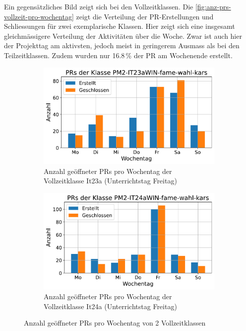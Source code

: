 Ein gegensätzliches Bild zeigt sich bei den Vollzeitklassen. Die \autoref{fig:anz-prs-vollzeit-pro-wochentag} zeigt die Verteilung der PR-Erstellungen und Schliessungen für zwei exemplarische Klassen.
Hier zeigt sich eine insgesamt gleichmässigere Verteilung der Aktivitäten über die Woche. Zwar ist auch hier der Projekttag am aktivsten, jedoch meist in geringerem Ausmass als bei den Teilzeitklassen. Zudem wurden nur 16.8\,\% der PR am Wochenende erstellt.

\begin{figure}[htbp]
    \centering
    \begin{subfigure}[b]{0.48\textwidth}
        \centering
        \includegraphics[width=\textwidth]{Figures/pr-klasse-per-wochentag-23a.pdf}
         \caption{Anzahl geöffneter PRs pro Wochentag der Vollzeitklasse It23a (Unterrichtstag Freitag)}
        \label{fig:anzahl-prs-pro-wochentag-it23a}
    \end{subfigure}
    \hfill
    \begin{subfigure}[b]{0.48\textwidth}
        \centering
        \includegraphics[width=\textwidth]{Figures/pr-klasse-per-wochentag-24a.pdf}
         \caption{Anzahl geöffneter PRs pro Wochentag der Vollzeitklasse It24a (Unterrichtstag Freitag)}
        \label{fig:anzahl-prs-pro-wochentag-it24a}
    \end{subfigure}
    \caption{Anzahl geöffneter PRs pro Wochentag von 2 Vollzeitklassen}
    \label{fig:anz-prs-vollzeit-pro-wochentag}
\end{figure}

